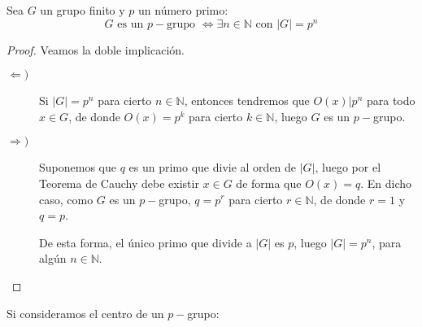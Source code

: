 \begin{coro}
    Sea $G$ un grupo finito y $p$ un número primo:
    \begin{equation*}
        G \text{\ es un $p-$grupo\ } \Longleftrightarrow \exists n\in \mathbb{N} \text{\ con\ } |G| = p^n
    \end{equation*}
    \begin{proof}
        Veamos la doble implicación.
        \begin{description}
            \item [$\Longleftarrow)$] Si $|G| = p^n$ para cierto $n\in \mathbb{N}$, entonces tendremos que $O(x) | p^n$ para todo $x\in G$, de donde $O(x) = p^k$ para cierto $k\in \mathbb{N}$, luego $G$ es un $p-$grupo.
            \item [$\Longrightarrow)$] Suponemos que $q$ es un primo que divie al orden de $|G|$, luego por el Teorema de Cauchy debe existir $x\in G$ de forma que $O(x) = q$. En dicho caso, como $G$ es un $p-$grupo, $q = p^r$ para cierto $r\in \mathbb{N}$, de donde $r = 1$ y $q = p$.

                De esta forma, el único primo que divide a $|G|$ es $p$, luego $|G| = p^n$, para algún $n\in \mathbb{N}$. \qedhere
        \end{description}
    \end{proof}
\end{coro}

Si consideramos el centro de un $p-$grupo:

